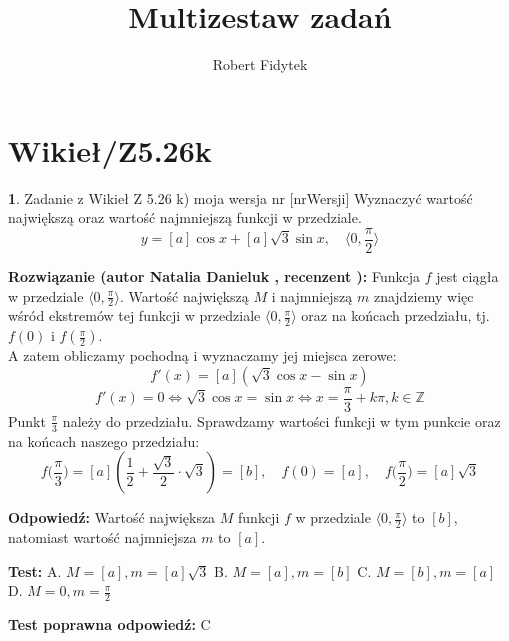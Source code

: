 \documentclass[12pt, a4paper]{article}
\title{Multizestaw zadań}
\author{Robert Fidytek}
\date{}
\theoremstyle{definition} %
\newtheorem{zad}{}
\newcommand{\kategoria}[1]{\section{#1}} %
\newcommand{\zadStart}[1]{\begin{zad}#1\newline} %
\newcommand{\zadStop}{\end{zad}}   %
\newcommand{\rozwStart}[2]{\noindent \textbf{Rozwiązanie (autor #1 , recenzent #2): }\newline} %
\newcommand{\rozwStop}{\newline}                                            %
\newcommand{\odpStart}{\noindent \textbf{Odpowiedź:}\newline}    %
\newcommand{\odpStop}{\newline}                                             %
\newcommand{\testStart}{\noindent \textbf{Test:}\newline} %
\newcommand{\testStop}{\newline} %
\newcommand{\kluczStart}{\noindent \textbf{Test poprawna odpowiedź:}\newline} %
\newcommand{\kluczStop}{\newline} %
\begin{document}
\maketitle

\kategoria{Wikieł/Z5.26k}

\zadStart{Zadanie z Wikieł Z 5.26 k) moja wersja nr [nrWersji]}
Wyznaczyć wartość największą oraz wartość najmniejszą funkcji w przedziale. 
$$y = [a]\cos x + [a]\sqrt{3}\sin x, \quad \big\langle 0,\frac{\pi}{2}\big\rangle$$
\zadStop

\rozwStart{Natalia Danieluk}{}
Funkcja $f$ jest ciągła w przedziale $\langle 0,\frac{\pi}{2} \rangle$. Wartość największą $M$ i najmniejszą $m$ znajdziemy więc wśród ekstremów tej funkcji w przedziale $\langle 0,\frac{\pi}{2} \rangle$ oraz na końcach przedziału, tj. $f(0)$ i $f(\frac{\pi}{2})$. \\
A zatem obliczamy pochodną i wyznaczamy jej miejsca zerowe:
$$ f'(x) = [a](\sqrt{3}\cos x - \sin x) $$
$$ f'(x) = 0 \Leftrightarrow \sqrt{3}\cos x = \sin x \Leftrightarrow x = \frac{\pi}{3} + k\pi, k \in \mathbb{Z} $$ 
Punkt $\frac{\pi}{3}$ należy do przedziału. Sprawdzamy wartości funkcji w tym punkcie oraz na końcach naszego przedziału: \\
$$ f\big(\frac{\pi}{3}\big) = [a](\frac{1}{2} + \frac{\sqrt{3}}{2}\cdot\sqrt{3})=[b],\quad f(0) = [a],\quad f\big(\frac{\pi}{2}\big) = [a]\sqrt{3} $$
\rozwStop

\odpStart
Wartość największa $M$ funkcji $f$ w przedziale $\langle 0,\frac{\pi}{2} \rangle$ to $[b]$, natomiast wartość najmniejsza $m$ to $[a]$.
\odpStop

\testStart
A. $M=[a], m=[a]\sqrt{3}$
B. $M=[a], m=[b]$
C. $M=[b], m=[a]$
D. $M=0, m=\frac{\pi}{2}$
\testStop

\kluczStart
C
\kluczStop
\end{document}
